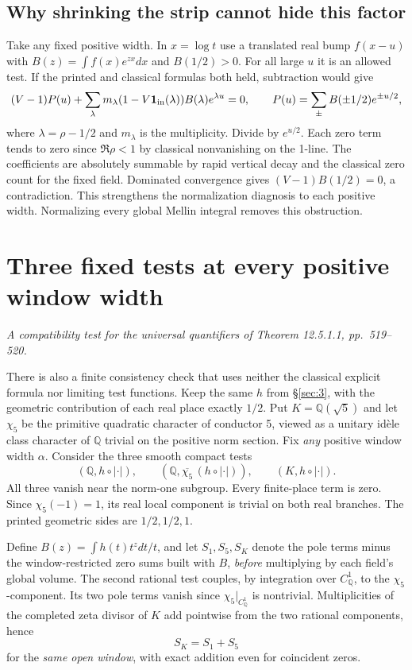 \documentclass[11pt,reqno]{amsart}
\numberwithin{equation}{section}
\newcommand{\Q}{\mathbb Q}\newcommand{\R}{\mathbb R}\newcommand{\C}{\mathbb C}\newcommand{\Z}{\mathbb Z}
\begin{document}
\subsection*{Why shrinking the strip cannot hide this factor}
Take any fixed positive width. In \(x=\log t\) use a translated real bump \(f(x-u)\) with \(B(z)=\int f(x)e^{zx}dx\) and \(B(1/2)>0\). For all large \(u\) it is an allowed test. If the printed and classical formulas both held, subtraction would give
\[
 (V-1)P(u)+\sum_{\lambda} m_\lambda(1-V\mathbf1_{\rm in}(\lambda))B(\lambda)e^{\lambda u}=0,\qquad
 P(u)=\sum_{\pm}B(\pm1/2)e^{\pm u/2},
\]
where \(\lambda=\rho-1/2\) and \(m_\lambda\) is the multiplicity. Divide by \(e^{u/2}\). Each zero term tends to zero since \(\Re\rho<1\) by classical nonvanishing on the 1-line. The coefficients are absolutely summable by rapid vertical decay and the classical zero count for the fixed field. Dominated convergence gives \((V-1)B(1/2)=0\), a contradiction. This strengthens the normalization diagnosis to each positive width. Normalizing every global Mellin integral removes this obstruction.


\section{Three fixed tests at every positive window width}\label{sec:4}

\textit{A compatibility test for the universal quantifiers of Theorem 12.5.1.1, pp.~519--520.}\par
There is also a finite consistency check that uses neither the classical explicit formula nor limiting test functions. Keep the same \(h\) from \S\ref{sec:3}, with the geometric contribution of each real place exactly \(1/2\). Put \(K=\Q(\sqrt5)\) and let \(\chi_5\) be the primitive quadratic character of conductor 5, viewed as a unitary idèle class character of \(\Q\) trivial on the positive norm section. Fix \emph{any} positive window width \(\alpha\). Consider the three smooth compact tests
\[
 (\Q,h\circ|\cdot|),\qquad
 (\Q,\overline{\chi_5}\,(h\circ|\cdot|)),\qquad
 (K,h\circ|\cdot|).
\]
All three vanish near the norm-one subgroup. Every finite-place term is zero. Since \(\chi_5(-1)=1\), its real local component is trivial on both real branches. The printed geometric sides are \(1/2,1/2,1\).

Define \(B(z)=\int h(t)t^zdt/t\), and let \(S_1,S_5,S_K\) denote the pole terms minus the window-restricted zero sums built with \(B\), \emph{before} multiplying by each field's global volume. The second rational test couples, by integration over \(C_\Q^1\), to the \(\chi_5\)-component. Its two pole terms vanish since \(\chi_5|_{C_\Q^1}\) is nontrivial. Multiplicities of the completed zeta divisor of \(K\) add pointwise from the two rational components, hence
\[
                S_K=S_1+S_5
\]
for the \emph{same open window}, with exact addition even for coincident zeros.
\end{document}
